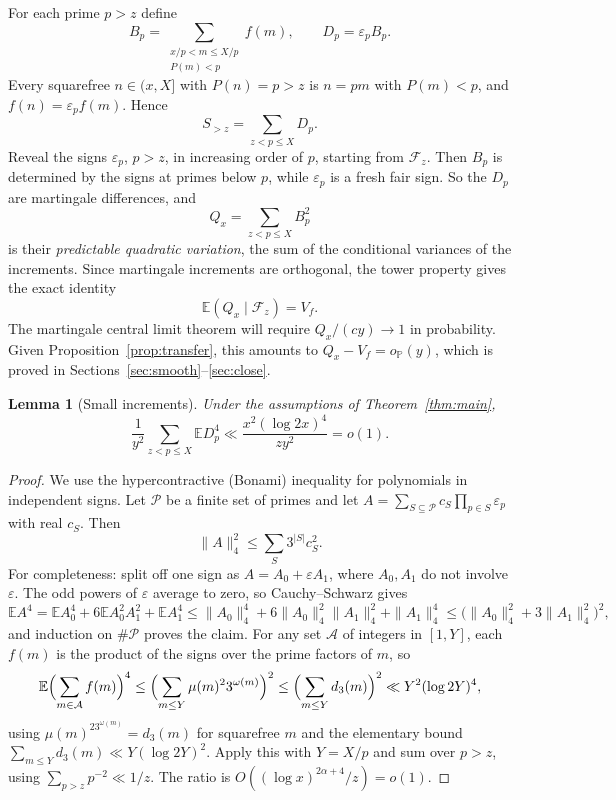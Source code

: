 \documentclass[11pt]{amsart}
\newtheorem{lemma}[theorem]{Lemma}
\theoremstyle{remark}
\numberwithin{equation}{section}
\newcommand{\E}{\mathbb{E}}
\renewcommand{\P}{\mathbb{P}}
\begin{document}
For each prime $p>z$ define
\[
B_p=\sum_{\substack{x/p<m\le X/p\\ P(m)<p}}f(m),\qquad D_p=\varepsilon_pB_p .
\]
Every squarefree $n\in(x,X]$ with $P(n)=p>z$ is $n=pm$ with $P(m)<p$, and $f(n)=\varepsilon_pf(m)$. Hence
\[
S_{>z}=\sum_{z<p\le X}D_p .
\]
Reveal the signs $\varepsilon_p$, $p>z$, in increasing order of $p$, starting from $\mathcal F_z$. Then $B_p$ is determined by the signs at primes below $p$, while $\varepsilon_p$ is a fresh fair sign. So the $D_p$ are martingale differences, and
\[
Q_x=\sum_{z<p\le X}B_p^2
\]
is their \emph{predictable quadratic variation}, the sum of the conditional variances of the increments. Since martingale increments are orthogonal, the tower property gives the exact identity
\begin{equation}\label{eq:tower}
\E(Q_x\mid\mathcal F_z)=V_f .
\end{equation}
The martingale central limit theorem will require $Q_x/(cy)\to1$ in probability. Given Proposition~\ref{prop:transfer}, this amounts to $Q_x-V_f=o_\P(y)$, which is proved in Sections~\ref{sec:smooth}--\ref{sec:close}.

\begin{lemma}[Small increments]\label{lem:small}
Under the assumptions of Theorem~\ref{thm:main},
\begin{equation}\label{eq:small}
\frac1{y^2}\sum_{z<p\le X}\E D_p^4\ll\frac{x^2(\log2x)^4}{zy^2}=o(1).
\end{equation}
\end{lemma}

\begin{proof}
We use the hypercontractive (Bonami) inequality for polynomials in independent signs. Let $\mathcal P$ be a finite set of primes and let $A=\sum_{S\subseteq\mathcal P}c_S\prod_{p\in S}\varepsilon_p$ with real $c_S$. Then
\[
\|A\|_4^2\le\sum_S3^{|S|}c_S^2 .
\]
For completeness: split off one sign as $A=A_0+\varepsilon A_1$, where $A_0,A_1$ do not involve $\varepsilon$. The odd powers of $\varepsilon$ average to zero, so Cauchy--Schwarz gives
\[
\E A^4=\E A_0^4+6\E A_0^2A_1^2+\E A_1^4\le\|A_0\|_4^4+6\|A_0\|_4^2\|A_1\|_4^2+\|A_1\|_4^4\le\bigl(\|A_0\|_4^2+3\|A_1\|_4^2\bigr)^2,
\]
and induction on $\#\mathcal P$ proves the claim. For any set $\mathcal A$ of integers in $[1,Y]$, each $f(m)$ is the product of the signs over the prime factors of $m$, so
\[
\E\Bigl(\sum_{m\in\mathcal A}f(m)\Bigr)^4\le\Bigl(\sum_{m\le Y}\mu(m)^23^{\omega(m)}\Bigr)^2\le\Bigl(\sum_{m\le Y}d_3(m)\Bigr)^2\ll Y^2(\log2Y)^4 ,
\]
using $\mu(m)^23^{\omega(m)}=d_3(m)$ for squarefree $m$ and the elementary bound $\sum_{m\le Y}d_3(m)\ll Y(\log2Y)^2$. Apply this with $Y=X/p$ and sum over $p>z$, using $\sum_{p>z}p^{-2}\ll1/z$. The ratio is $O((\log x)^{2\alpha+4}/z)=o(1)$.
\end{proof}
\end{document}

